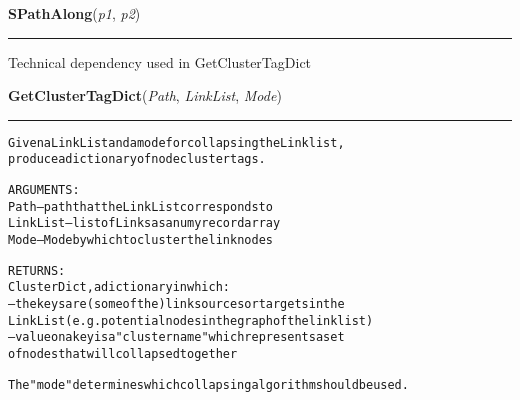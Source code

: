     \vspace{0.5ex}

\hspace{.8\funcindent}\begin{boxedminipage}{\funcwidth}

    \raggedright \textbf{SPathAlong}(\textit{p1}, \textit{p2})

    \vspace{-1.5ex}

    \rule{\textwidth}{0.5\fboxrule}
\setlength{\parskip}{2ex}
    Technical dependency used in GetClusterTagDict

\setlength{\parskip}{1ex}
    \end{boxedminipage}

    \label{System:SystemGraphOperations:GetClusterTagDict}

    \vspace{0.5ex}

\hspace{.8\funcindent}\begin{boxedminipage}{\funcwidth}

    \raggedright \textbf{GetClusterTagDict}(\textit{Path}, \textit{LinkList}, \textit{Mode})

    \vspace{-1.5ex}

    \rule{\textwidth}{0.5\fboxrule}
\setlength{\parskip}{2ex}
\begin{alltt}

Given a  LinkList and a mode for collapsing the Linklist, 
produce a dictionary of node cluster tags. 

ARGUMENTS:
        Path -- path that the LinkList corresponds to
        LinkList -- list of Links as a numy record array
        Mode -- Mode by which to cluster the link nodes
        
RETURNS:
        ClusterDict, a dictionary in which:
        -- the keys are (some of the) link sources or targets in the 
                LinkList (e.g. potential nodes in the graph of the linklist)
        -- value on a key is a "cluster name " which represents a set 
        of nodes that will collapsed together
        
The "mode" determines which collapsing algorithm should be used.  
        
\end{alltt}

\setlength{\parskip}{1ex}
    \end{boxedminipage}

